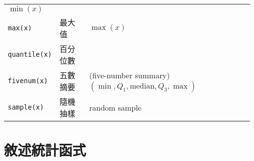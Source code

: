 \documentclass[
]{book}
\begin{document}
\begin{longtable}[]{@{}lll@{}}
\begin{minipage}[t]{0.51\columnwidth}
\(\min (x)\)\strut
\end{minipage}\tabularnewline
\begin{minipage}[t]{0.19\columnwidth}\raggedright
\texttt{max(x)}\strut
\end{minipage} & \begin{minipage}[t]{0.21\columnwidth}\raggedright
最大值\strut
\end{minipage} & \begin{minipage}[t]{0.51\columnwidth}\raggedright
\(\max (x)\)\strut
\end{minipage}\tabularnewline
\begin{minipage}[t]{0.19\columnwidth}\raggedright
\texttt{quantile(x)}\strut
\end{minipage} & \begin{minipage}[t]{0.21\columnwidth}\raggedright
百分位數\strut
\end{minipage} & \begin{minipage}[t]{0.51\columnwidth}\raggedright
\strut
\end{minipage}\tabularnewline
\begin{minipage}[t]{0.19\columnwidth}\raggedright
\texttt{fivenum(x)}\strut
\end{minipage} & \begin{minipage}[t]{0.21\columnwidth}\raggedright
五數摘要\strut
\end{minipage} & \begin{minipage}[t]{0.51\columnwidth}\raggedright
(five-number summary) \((\min, Q_1, \text{median}, Q_3, \max)\)\strut
\end{minipage}\tabularnewline
\begin{minipage}[t]{0.19\columnwidth}\raggedright
\texttt{sample(x)}\strut
\end{minipage} & \begin{minipage}[t]{0.21\columnwidth}\raggedright
隨機抽樣\strut
\end{minipage} & \begin{minipage}[t]{0.51\columnwidth}\raggedright
random sample\strut
\end{minipage}\tabularnewline
\bottomrule
\end{longtable}

\hypertarget{ux6558ux8ff0ux7d71ux8a08ux51fdux5f0f}{%
\section{敘述統計函式}\label{ux6558ux8ff0ux7d71ux8a08ux51fdux5f0f}}
\end{document}
